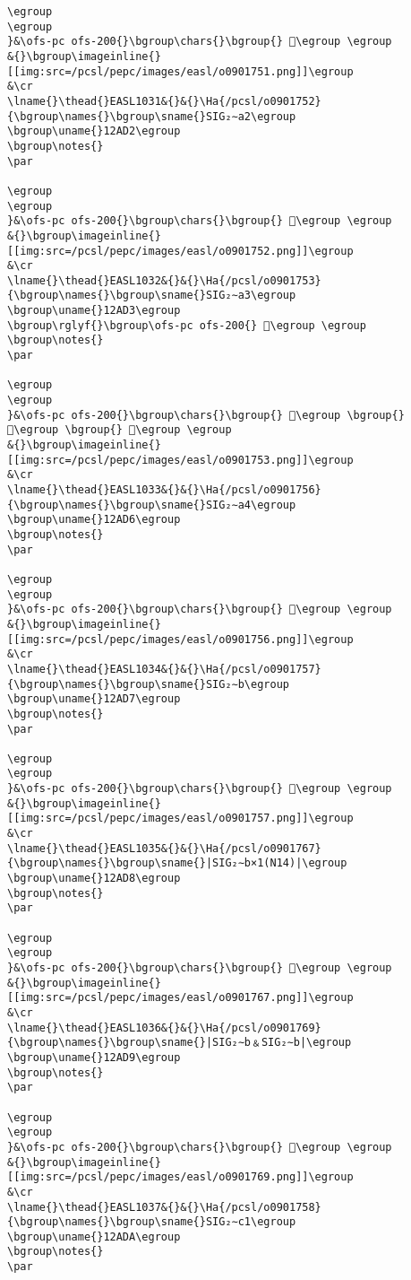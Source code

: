 \begin{verbatim}
\egroup
\egroup
}&\ofs-pc ofs-200{}\bgroup\chars{}\bgroup{} 𒫑\egroup \egroup
&{}\bgroup\imageinline{}[[img:src=/pcsl/pepc/images/easl/o0901751.png]]\egroup
&\cr
\lname{}\thead{}EASL1031&{}&{}\Ha{/pcsl/o0901752}{\bgroup\names{}\bgroup\sname{}SIG₂∼a2\egroup
\bgroup\uname{}12AD2\egroup
\bgroup\notes{}
\par 

\egroup
\egroup
}&\ofs-pc ofs-200{}\bgroup\chars{}\bgroup{} 𒫒\egroup \egroup
&{}\bgroup\imageinline{}[[img:src=/pcsl/pepc/images/easl/o0901752.png]]\egroup
&\cr
\lname{}\thead{}EASL1032&{}&{}\Ha{/pcsl/o0901753}{\bgroup\names{}\bgroup\sname{}SIG₂∼a3\egroup
\bgroup\uname{}12AD3\egroup
\bgroup\rglyf{}\bgroup\ofs-pc ofs-200{} 𒫓\egroup \egroup
\bgroup\notes{}
\par 

\egroup
\egroup
}&\ofs-pc ofs-200{}\bgroup\chars{}\bgroup{} 𒫓\egroup \bgroup{} 𒫔\egroup \bgroup{} 𒫕\egroup \egroup
&{}\bgroup\imageinline{}[[img:src=/pcsl/pepc/images/easl/o0901753.png]]\egroup
&\cr
\lname{}\thead{}EASL1033&{}&{}\Ha{/pcsl/o0901756}{\bgroup\names{}\bgroup\sname{}SIG₂∼a4\egroup
\bgroup\uname{}12AD6\egroup
\bgroup\notes{}
\par 

\egroup
\egroup
}&\ofs-pc ofs-200{}\bgroup\chars{}\bgroup{} 𒫖\egroup \egroup
&{}\bgroup\imageinline{}[[img:src=/pcsl/pepc/images/easl/o0901756.png]]\egroup
&\cr
\lname{}\thead{}EASL1034&{}&{}\Ha{/pcsl/o0901757}{\bgroup\names{}\bgroup\sname{}SIG₂∼b\egroup
\bgroup\uname{}12AD7\egroup
\bgroup\notes{}
\par 

\egroup
\egroup
}&\ofs-pc ofs-200{}\bgroup\chars{}\bgroup{} 𒫗\egroup \egroup
&{}\bgroup\imageinline{}[[img:src=/pcsl/pepc/images/easl/o0901757.png]]\egroup
&\cr
\lname{}\thead{}EASL1035&{}&{}\Ha{/pcsl/o0901767}{\bgroup\names{}\bgroup\sname{}|SIG₂∼b×1(N14)|\egroup
\bgroup\uname{}12AD8\egroup
\bgroup\notes{}
\par 

\egroup
\egroup
}&\ofs-pc ofs-200{}\bgroup\chars{}\bgroup{} 𒫘\egroup \egroup
&{}\bgroup\imageinline{}[[img:src=/pcsl/pepc/images/easl/o0901767.png]]\egroup
&\cr
\lname{}\thead{}EASL1036&{}&{}\Ha{/pcsl/o0901769}{\bgroup\names{}\bgroup\sname{}|SIG₂∼b﹠SIG₂∼b|\egroup
\bgroup\uname{}12AD9\egroup
\bgroup\notes{}
\par 

\egroup
\egroup
}&\ofs-pc ofs-200{}\bgroup\chars{}\bgroup{} 𒫙\egroup \egroup
&{}\bgroup\imageinline{}[[img:src=/pcsl/pepc/images/easl/o0901769.png]]\egroup
&\cr
\lname{}\thead{}EASL1037&{}&{}\Ha{/pcsl/o0901758}{\bgroup\names{}\bgroup\sname{}SIG₂∼c1\egroup
\bgroup\uname{}12ADA\egroup
\bgroup\notes{}
\par 


\end{verbatim}
